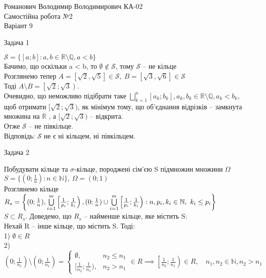 \documentclass[12 pt]{article}
\begin{document}
\begin{center}
    \Large
    Романович Володимир Володимирович КА-02 \\
    Самостійна робота №2 \\ 
    Варіант 9
\end{center}
\begin{center}
    \Large 
    Задача 1
\end{center}
$\mathcal{S} = \{ [a;b] : a, b \in \mathbb{R} \setminus \mathbb{Q}, a < b \}$ \\
Бачимо, що оскільки a < b, то $\emptyset \notin \mathcal{S}$, тому $\mathcal{S}$ -- не кільце \\ 
Розглянемо тепер $A = \left[\sqrt{2}, \sqrt{5} \right] \in \mathcal{S}, 
\ B = \left[\sqrt{3}, \sqrt{6} \right] \in \mathcal{S}$ \\ 
Тоді $A \setminus B = \left[\sqrt{2}; \sqrt{3}\right)$. \\
Очевидно, що неможливо
підібрати таке $\bigsqcup_{k=1}^{n} 
[a_{k}; b_{k}], a_k, b_k \in \mathbb{R} \setminus \mathbb{Q}, a_k < b_k$, 
щоб отримати $[\sqrt{2};\sqrt{3})$, як мінімум тому, що 
об'єднання відрізків -- замкнута множина на $\mathbb{R}$ , а $[\sqrt{2};\sqrt{3})$ -- відкрита. \\ 
Отже $\mathcal{S}$ -- не півкільце. \\ 
Відповідь: $\mathcal{S}$ не є ні кільцем, ні півкільцем.
\begin{center}
    \Large 
    Задача 2
\end{center}
Побудувати кільце та $\sigma$-кільце, породжені сім'єю S підмножин множини $\Omega$ \\ 
$S = \{ (0;\frac{1}{n}) : n \in \mathbb{N}  \}, \ \Omega = (0;1) $ 
\\
Розглянемо кільце 
$R_s = \left\{ (0;\frac{1}{n}), 
\bigcup_{i=1}^m\limits \left[\frac{1}{p_i};\frac{1}{k_i}\right), 
(0;\frac{1}{n}) \cup  
\bigcup_{i=1}^m\limits \left[\frac{1}{p_i};\frac{1}{k_i}\right) :
n, p_i, k_i \in \mathbb{N}, \ k_i \leq p_i  \right\}$ \\ 
$S \subset R_s$. Доведемо, що $R_s$ -- найменше кільце, яке містить S: \\ 
Нехай R -- інше кільце, що містить S. Тоді: \\
1) $\emptyset \in R$ \\
2) $\left(0;\frac{1}{n_1}\right) \setminus \left(0;\frac{1}{n_1} \right) = \begin{cases}
    \emptyset, & n_2 \leq n_1 \\ 
    [\frac{1}{n_2}; \frac{1}{n_1}), & n_2 > n_1 
\end{cases} \in R \implies \left[\frac{1}{n_2}; \frac{1}{n_1}\right) \in R, \quad n_1, n_2 \in \mathbb{N}, n_2 > n_1 $ \\ 
\end{document}
